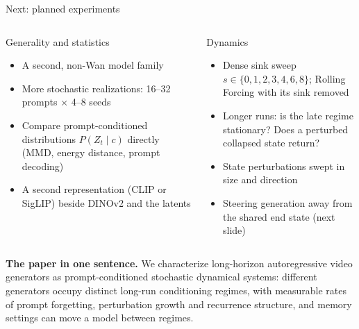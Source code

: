 \documentclass[aspectratio=169,10pt]{beamer}
\newcommand{\take}[1]{\begin{center}\colorbox{nyugreybox}{\parbox{0.94\linewidth}{\centering\small #1}}\end{center}}
\begin{document}
\begin{frame}{Next: planned experiments}
\begin{columns}[T]
\begin{block}{Generality and statistics}
\begin{itemize}\footnotesize
  \item A second, non-Wan model family
  \item More stochastic realizations: 16--32 prompts $\times$ 4--8 seeds
  \item Compare prompt-conditioned distributions $P(Z_t\mid c)$ directly (MMD, energy distance, prompt decoding)
  \item A second representation (CLIP or SigLIP) beside DINOv2 and the latents
\end{itemize}
\end{block}
\begin{block}{Dynamics}
\begin{itemize}\footnotesize
  \item Dense sink sweep $s \in \{0,1,2,3,4,6,8\}$; Rolling Forcing with its sink removed
  \item Longer runs: is the late regime stationary? Does a perturbed collapsed state return?
  \item State perturbations swept in size and direction
  \item Steering generation away from the shared end state (next slide)
\end{itemize}
\end{block}
\end{columns}
\vspace{4pt}
\take{\footnotesize\textbf{The paper in one sentence.} We characterize long-horizon autoregressive video generators as prompt-conditioned stochastic dynamical systems: different generators occupy distinct long-run conditioning regimes, with measurable rates of prompt forgetting, perturbation growth and recurrence structure, and memory settings can move a model between regimes.}
\end{frame}
\end{document}
